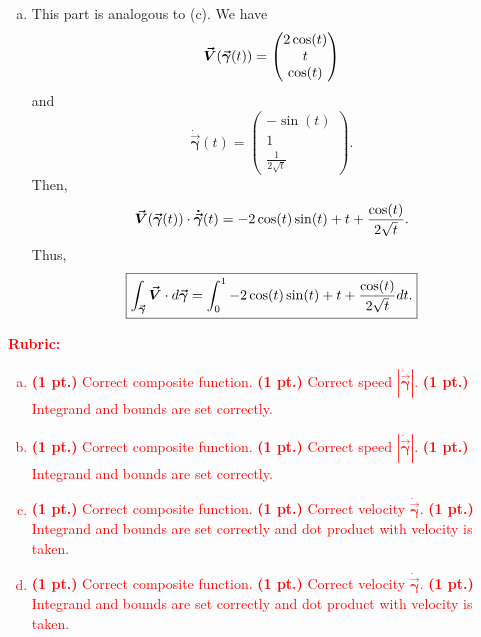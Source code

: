 \documentclass[12pt]{article} %
\newcommand{\curvegamma}{\boldsymbol{\vec{\gamma}}}
\newcommand{\tangentgamma}{\boldsymbol{\dot{\vec{\gamma}}}}
\begin{document}
\begin{solution}
\begin{enumerate}[(a)]
    \item This part is analogous to (c). We have
    \[
    \vecfieldV(\curvegamma(t)) = \begin{pmatrix} 2 \cos(t) \\ t \\ \cos(t) \end{pmatrix}
    \]
    and
    \[
    \tangentgamma(t) = \begin{pmatrix} -\sin(t) \\ 1 \\ \frac{1}{2\sqrt{t}} \end{pmatrix}.
    \]
    Then,
    \[
    \vecfieldV(\curvegamma(t)) \cdot \tangentgamma(t) = -2 \cos(t) \sin(t) + t + \frac{\cos(t)}{2\sqrt{t}}.
    \]
    Thus,
    \[
    \boxed{\int_{\curvegamma} \vecfieldV \cdot d\curvegamma = \int_0^1 -2 \cos(t) \sin(t) + t + \frac{\cos(t)}{2\sqrt{t}} dt.}
    \]
\end{enumerate}
\end{solution}
\vspace*{1cm}
\textcolor{red}{
\noindent \textbf{Rubric:}
\begin{enumerate}[(a)]
    \item \textbf{(1 pt.)} Correct composite function. \textbf{(1 pt.)} Correct speed $|\tangentgamma|$. \textbf{(1 pt.)} Integrand and bounds are set correctly.
    \item \textbf{(1 pt.)} Correct composite function. \textbf{(1 pt.)} Correct speed $|\tangentgamma|$. \textbf{(1 pt.)} Integrand and bounds are set correctly.
    \item \textbf{(1 pt.)} Correct composite function. \textbf{(1 pt.)} Correct velocity $\tangentgamma$. \textbf{(1 pt.)} Integrand and bounds are set correctly and dot product with velocity is taken.
    \item \textbf{(1 pt.)} Correct composite function. \textbf{(1 pt.)} Correct velocity $\tangentgamma$. \textbf{(1 pt.)} Integrand and bounds are set correctly and dot product with velocity is taken.
\end{enumerate}
}
\end{document}
